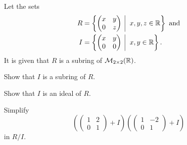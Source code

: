 \begin{exercise}
    Let the sets
    \begin{align*}
        R &= \left\{\begin{pmatrix}x&y\\0&z\end{pmatrix} \vert x,y,z \in \R\right\} \text{ and}\\
        I &= \left\{\begin{pmatrix}x&y\\0&0\end{pmatrix} \vert x,y \in \R\right\}.
    \end{align*}
    It is given that $R$ is a subring of $\mathcal{M}_{2\times2}(\mathbb{R})$.
    \begin{partquestions}{\roman*}
        \item Show that $I$ is a subring of $R$.
        \item Show that $I$ is an ideal of $R$.
        \item Simplify
        \[
            \left(\begin{pmatrix}1&2\\0&1\end{pmatrix} + I\right)\left(\begin{pmatrix}1&-2\\0&1\end{pmatrix} + I\right)
        \]
        in $R/I$.
    \end{partquestions}
\end{exercise}

